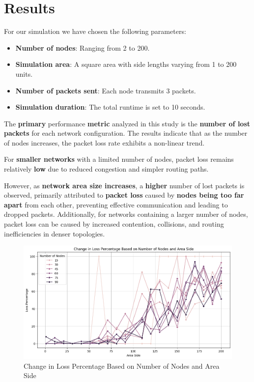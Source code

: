 \documentclass[../report.tex]{subfiles}
\begin{document}
\section{Results}

For our simulation we have chosen the following parameters:
\begin{itemize}
    \item \textbf{Number of nodes}: Ranging from 2 to 200.
    \item \textbf{Simulation area}: A square area with side lengths varying from 1 to 200 units.
    \item \textbf{Number of packets sent}: Each node transmits 3 packets.
    \item \textbf{Simulation duration}: The total runtime is set to 10 seconds.
\end{itemize}

The \textbf{primary} performance \textbf{metric} analyzed in this study is the \textbf{number of lost packets} for each network configuration. The results indicate that as the number of nodes increases, the packet loss rate exhibits a non-linear trend. 

For \textbf{smaller networks} with a limited number of nodes, packet loss remains relatively \textbf{low} due to reduced congestion and simpler routing paths.

However, as \textbf{network area size increases}, a \textbf{higher} number of lost packets is observed, primarily attributed to \textbf{packet loss} caused by \textbf{nodes being too far apart} from each other, preventing effective communication and leading to dropped packets. Additionally, for networks containing a larger number of nodes, packet loss can be caused by increased contention, collisions, and routing inefficiencies in denser topologies.


\begin{figure}[H]
    \centering
    \includegraphics[width=1\linewidth]{images/loss_by_area.png}
    \caption{Change in Loss Percentage Based on Number of Nodes and Area Side}
    \label{fig:enter-label}
\end{figure}
\end{document}
